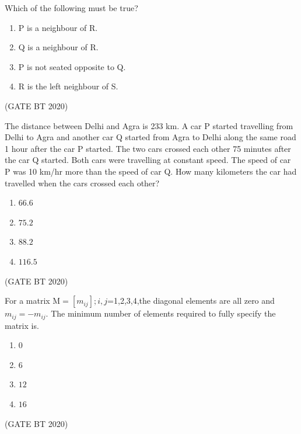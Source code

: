 \documentclass[journal,12pt,onecolumn]{IEEEtran}
\theoremstyle{remark}
\begin{document}
Which of the following must be true?
\begin{multicols}{2}
 \begin{enumerate}

\item\;P is a neighbour of R.
\item\;Q is a neighbour of R.
\item\;P is not seated opposite to Q.
\item\;R is the left neighbour of S.

\end{enumerate}
\end{multicols}
\hfill(GATE BT 2020)

\item The distance between Delhi and Agra is 233 km. A car P started travelling from Delhi to Agra and another car Q started from Agra to Delhi along the same road 1 hour after the car P started. The two cars crossed each other 75 minutes after the car Q started. Both cars were travelling at constant speed. The speed of car P was 10 km/hr more than the speed of car Q. How many kilometers the car had travelled when the cars crossed each other?
\begin{multicols}{4}
\begin{enumerate}
\item\;$66.6$
\item\;$75.2$
\item\;$88.2$
\item\;$116.5$
\end{enumerate}
\end{multicols}
\hfill(GATE BT 2020)

\item  For a matrix M$=$${[m_{ij}]}$$;i,j$=1,2,3,4,the diagonal elements are all zero and ${m_{ij}}=-$${m_{ij}}$. The minimum number of elements required to fully specify the matrix is.
\begin{multicols}{4}
\begin{enumerate}

\item\;$0$
\item\;$6$
\item\;$12$
\item\;$16$

\end{enumerate} 
\end{multicols}\hfill(GATE BT 2020)\\
\end{document}
